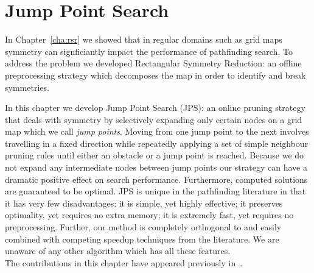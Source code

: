 \chapter{Jump Point Search}
\label{cha:jps}
In Chapter~\ref{cha:rsr} we showed that in regular domains such as grid maps
symmetry can signficiantly impact the performance of pathfinding search.
 To address the problem we developed Rectangular Symmetry Reduction:
 an offline preprocessing strategy which decomposes the map in order to 
identify and break symmetries. 

In this chapter we develop Jump Point Search (JPS): an online pruning strategy that
deals with symmetry by selectively expanding only certain nodes on a grid map
which we call \emph{jump points}.  Moving from one jump point to the next
involves travelling in a fixed direction while repeatedly applying a set of
simple neighbour pruning rules until either an obstacle or a jump point is
reached.  Because we do not expand any intermediate nodes between jump points
our strategy can have a dramatic positive effect on search performance.
Furthermore, computed solutions are guaranteed to be optimal.  
JPS is unique in the pathfinding literature in that it has very few
disadvantages: it is simple, yet highly effective; it preserves optimality, yet
requires no extra memory;  it is extremely fast, yet requires no preprocessing.
Further, our method is completely orthogonal to and easily combined with 
competing speedup techniques from the literature.
We are unaware of any other algorithm which has all these features.
\\ \newline 
The contributions in this chapter have appeared previously in~\cite{harabor11b,harabor12}.
